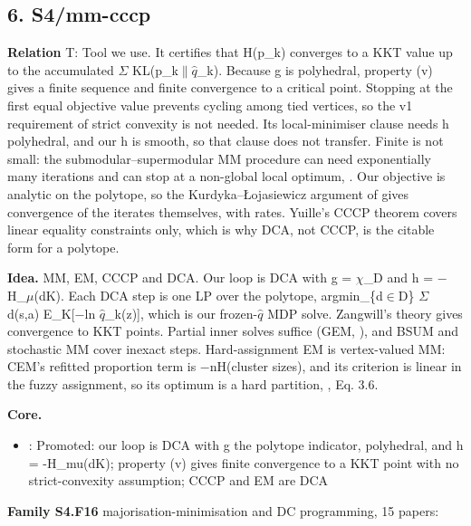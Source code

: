 \documentclass[10pt]{article}
\newcommand{\memb}[1]{\par\smallskip\textbf{#1}\quad}
\begin{document}
\subsection{6. S4/mm-cccp}\label{node:S4-S4-mm-cccp}
\textbf{Relation} \textsf{T}: Tool we use. It certifies that H(p\_k) converges to a KKT value up to the accumulated \ensuremath{\Sigma} KL(p\_k\ensuremath{\|}\ensuremath{\hat{q}}\_k). Because g is polyhedral, \citet{LeThi-dc18} property (v) gives a finite sequence and finite convergence to a critical point. Stopping at the first equal objective value prevents cycling among tied vertices, so the v1 requirement of strict convexity is not needed. Its local-minimiser clause needs h polyhedral, and our h is smooth, so that clause does not transfer. Finite is not small: the submodular--supermodular MM procedure can need exponentially many iterations and can stop at a non-global local optimum, \citet{Byrnes-tight15}. Our objective is analytic on the polytope, so the Kurdyka--\L{}ojasiewicz argument of \citet{Kang-global15} gives convergence of the iterates themselves, with rates. Yuille's CCCP theorem covers linear equality constraints only, which is why DCA, not CCCP, is the citable form for a polytope.

\textbf{Idea.} MM, EM, CCCP and DCA. Our loop is DCA with g = \ensuremath{\chi}\_D and h = \ensuremath{-}H\_\ensuremath{\mu}(dK). Each DCA step is one LP over the polytope, argmin\_\{d\ensuremath{\in}D\} \ensuremath{\Sigma} d(s,a) E\_K[\ensuremath{-}ln \ensuremath{\hat{q}}\_k(z)], which is our frozen-\ensuremath{\hat{q}} MDP solve. Zangwill's theory gives convergence to KKT points. Partial inner solves suffice (GEM, \citet{Dempster-maximum77}), and BSUM and stochastic MM cover inexact steps. Hard-assignment EM is vertex-valued MM: CEM's refitted proportion term is \ensuremath{-}nH(cluster sizes), and its criterion is linear in the fuzzy assignment, so its optimum is a hard partition, \citet{Celeux-classification92}, Eq. 3.6.

\memb{Core.}
\begin{itemize}[nosep,leftmargin=1.2em]
\item \citet{LeThi-dc18}: Promoted: our loop is DCA with g the polytope indicator, polyhedral, and h = -H\_mu(dK); property (v) gives finite convergence to a KKT point with no strict-convexity assumption; CCCP and EM are DCA
\end{itemize}
\memb{Family S4.F16} majorisation-minimisation and DC programming, 15 papers: {\footnotesize \citetext{\citealp{LeThi-dc18}; \citealp{Yuille-concaveconvex03}; \citealp{Hunter-tutorial04}; \citealp{Sriperumbudur-convergence09}; \citealp{Kang-global15}; \citealp{Zangwill-nonlinear69}; \citealp{Lange-optimization00}; \citealp{Sriperumbudur-proof12}; \citealp{Mairal-stochastic13}; \citealp{Razaviyayn-unified13}; \citealp{Mairal-incremental15}; \citealp{Lange-mm16}; \citealp{Lipp-variations16}; \citealp{Khamaru-convergence18}; \citealp{LeThi-open23}}}
\end{document}
